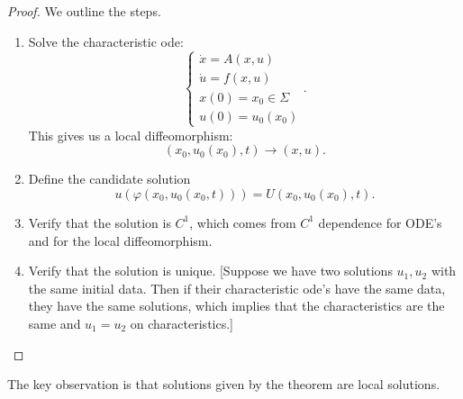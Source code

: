 \documentclass[11pt]{scrartcl}
\let \phi \varphi
\begin{document}
\begin{proof} We outline the steps.
\begin{enumerate}
\item Solve the characteristic ode:
$$\begin{cases}
\dot{x} = A(x, u)\\
\dot{u} = f(x, u)\\
x(0) = x_0 \in \Sigma \\
u(0) = u_0(x_0)
\end{cases}.$$
This gives us a local diffeomorphism:
$$(x_0, u_0(x_0), t) \rightarrow (x, u).$$
\item Define the candidate solution
$$u(\phi(x_0, u_0(x_0, t))) = U(x_0, u_0(x_0), t).$$
\item Verify that the solution is $C^1$, which comes from $C^1$ dependence for ODE's and for the local diffeomorphism.
\item Verify that the solution is unique.  [Suppose we have two solutions $u_1, u_2$ with the same initial data.   Then if their characteristic ode's have the same data, they have the same solutions, which implies that the characteristics are the same and $u_1 = u_2$ on characteristics.]
\end{enumerate}
\end{proof}
The key observation is that solutions given by the theorem are local solutions.
\end{document}

